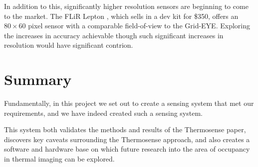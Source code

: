 \documentclass[../thesis/thesis.tex]{subfiles}
\begin{document}
In addition to this, significantly higher resolution sensors are beginning to come to the market. The FLiR Lepton \cite{flir}, which sells in a dev kit for \$350, offers an $80 \times 60$ pixel sensor with a comparable field-of-view to the Grid-EYE. Exploring the increases in accuracy achievable though such significant increases in resolution would have significant contrion.

\section{Summary}
Fundamentally, in this project we set out to create a sensing system that met our requirements, and we have indeed created such a sensing system.

This system both validates the methods and results of the Thermosense paper, discovers key caveats surrounding the Thermosense approach, and also creates a software and hardware base on which future research into the area of occupancy in thermal imaging can be explored.
 
\end{document}
